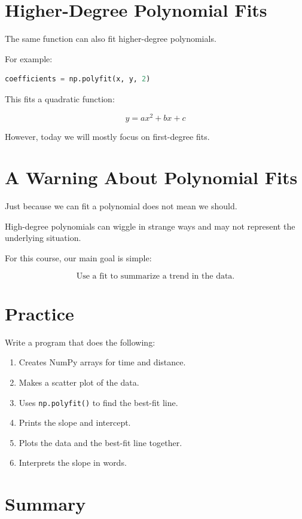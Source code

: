 \documentclass[11pt]{article}
\begin{document}
\section{Higher-Degree Polynomial Fits}

The same function can also fit higher-degree polynomials.

For example:

\begin{lstlisting}[language=Python]
coefficients = np.polyfit(x, y, 2)
\end{lstlisting}

This fits a quadratic function:

\[
y = ax^2 + bx + c
\]

However, today we will mostly focus on first-degree fits.

\section{A Warning About Polynomial Fits}

Just because we can fit a polynomial does not mean we should.

High-degree polynomials can wiggle in strange ways and may not represent the underlying situation.

For this course, our main goal is simple:

\[
\text{Use a fit to summarize a trend in the data.}
\]

\section{Practice}

Write a program that does the following:

\begin{enumerate}
    \item Creates NumPy arrays for time and distance.
    \item Makes a scatter plot of the data.
    \item Uses \texttt{np.polyfit()} to find the best-fit line.
    \item Prints the slope and intercept.
    \item Plots the data and the best-fit line together.
    \item Interprets the slope in words.
\end{enumerate}

\section{Summary}
\end{document}
